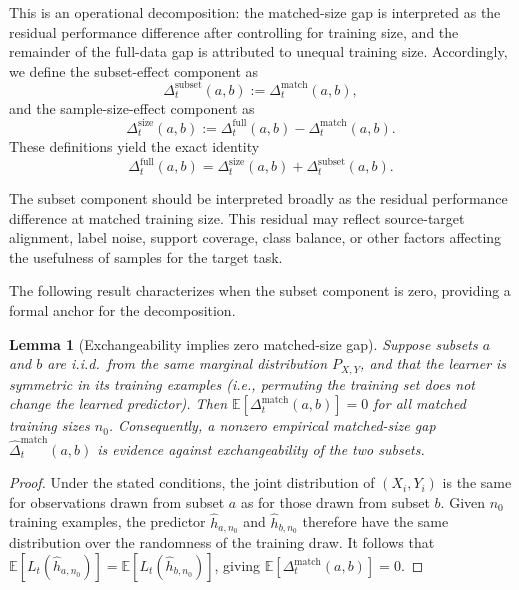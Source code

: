 \documentclass{article}
\newtheorem{lemma}{Lemma}
\begin{document}
This is an operational decomposition: the matched-size gap is interpreted as the residual performance difference after controlling for training size, and the remainder of the full-data gap is attributed to unequal training size.
Accordingly, we define the subset-effect component as
\begin{equation}
\Delta_t^{\mathrm{subset}}(a,b)
:=
\Delta_t^{\mathrm{match}}(a,b),
\label{eq:subset-component}
\end{equation}
and the sample-size-effect component as
\begin{equation}
\Delta_t^{\mathrm{size}}(a,b)
:=
\Delta_t^{\mathrm{full}}(a,b)-\Delta_t^{\mathrm{match}}(a,b).
\label{eq:size-component}
\end{equation}
These definitions yield the exact identity
\begin{equation}
\Delta_t^{\mathrm{full}}(a,b)
=
\Delta_t^{\mathrm{size}}(a,b)
+
\Delta_t^{\mathrm{subset}}(a,b).
\label{eq:gap-decomposition}
\end{equation}

The subset component should be interpreted broadly as the residual performance difference at matched training size.
This residual may reflect source-target alignment, label noise, support coverage, class balance, or other factors affecting the usefulness of samples for the target task.

The following result characterizes when the subset component is zero, providing a formal anchor for the decomposition.

\begin{lemma}[Exchangeability implies zero matched-size gap]
\label{lem:exchangeability}
Suppose subsets $a$ and $b$ are i.i.d.\ from the same marginal distribution $P_{X,Y}$, and that the learner is symmetric in its training examples (i.e., permuting the training set does not change the learned predictor).
Then $\mathbb{E}[\Delta_t^{\mathrm{match}}(a,b)] = 0$ for all matched training sizes $n_0$.
Consequently, a nonzero empirical matched-size gap $\widehat{\Delta}_t^{\mathrm{match}}(a,b)$ is evidence against exchangeability of the two subsets.
\end{lemma}

\begin{proof}
Under the stated conditions, the joint distribution of $(X_i, Y_i)$ is the same for observations drawn from subset $a$ as for those drawn from subset $b$.
Given $n_0$ training examples, the predictor $\hat{h}_{a,n_0}$ and $\hat{h}_{b,n_0}$ therefore have the same distribution over the randomness of the training draw.
It follows that $\mathbb{E}[L_t(\hat{h}_{a,n_0})] = \mathbb{E}[L_t(\hat{h}_{b,n_0})]$, giving $\mathbb{E}[\Delta_t^{\mathrm{match}}(a,b)] = 0$.
\end{proof}
\end{document}
